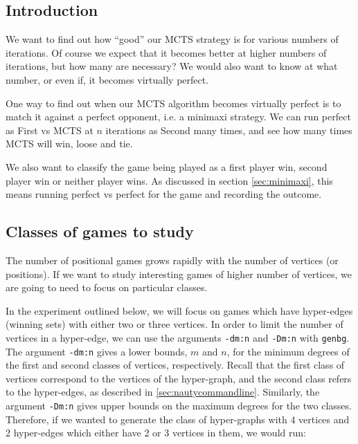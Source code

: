 \subsection{Introduction}


We want to find out how ``good'' our MCTS strategy is for various numbers of iterations.
Of course we expect that it becomes better at higher numbers of iterations, but how many are necessary?
We would also want to know at what number, or even if, it becomes virtually perfect.


One way to find out when our MCTS algorithm becomes virtually perfect is to match it against a perfect opponent, i.e. a minimaxi strategy.
We can run perfect as First vs MCTS at $n$ iterations as Second many times, and see how many times MCTS will win, loose and tie.

We also want to classify the game being played as a first player win, second player win or neither player wins.
As discussed in section \ref{sec:minimaxi}, this means running perfect vs perfect for the game and recording the outcome.


\subsection{Classes of games to study}

The number of positional games grows rapidly with the number of vertices (or positions).
If we want to study interesting games of higher number of vertices, we are going to need to focus on particular classes.

In the experiment outlined below, we will focus on games which have hyper-edges (winning sets) with either two or three vertices.
In order to limit the number of vertices in a hyper-edge, we can use the arguments \texttt{-dm:n} and \texttt{-Dm:n} with \texttt{genbg}.
The argument \texttt{-dm:n} gives a lower bounds, $m$ and $n$, for the minimum degrees of the first and second classes of vertices, respectively.
Recall that the first class of vertices correspond to the vertices of the hyper-graph, and the second class refers to the hyper-edges, as described in \ref{sec:nautycommandline}.
Similarly, the argument \texttt{-Dm:n} gives upper bounds on the maximum degrees for the two classes.
Therefore, if we wanted to generate the class of hyper-graphs with 4 vertices and 2 hyper-edges which either have 2 or 3 vertices in them, we would run:



